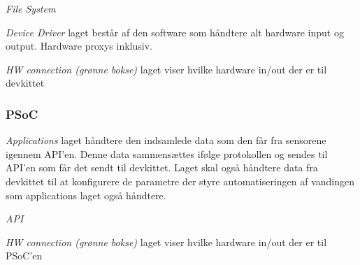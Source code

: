 \textit{File System}

\textit{Device Driver} laget består af den software som håndtere alt hardware input og output. Hardware proxys inklusiv.

\textit{HW connection (grønne bokse)} laget viser hvilke hardware in/out der er til devkittet

\subsubsection{PSoC}

\textit{Applications} laget håndtere den indsamlede data som den får fra sensorene igennem API'en. Denne data sammensættes ifølge protokollen og sendes til API'en som får det sendt til devkittet. Laget skal også håndtere data fra devkittet til at konfigurere de parametre der styre automatiseringen af vandingen som applications laget også håndtere.

\textit{API}

\textit{HW connection (grønne bokse)} laget viser hvilke hardware in/out der er til PSoC'en